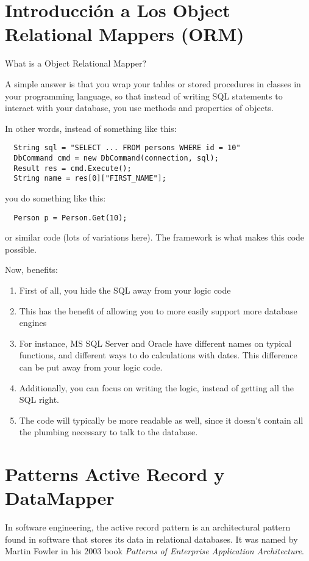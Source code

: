 
\section{Introducción a Los Object Relational Mappers (ORM)}

What is a Object Relational Mapper?

A simple answer is that you wrap your tables or stored procedures
in classes in your programming language, so that instead of writing
SQL statements to interact with your database, you use methods and
properties of objects.

In other words, instead of something like this:

\begin{verbatim}
  String sql = "SELECT ... FROM persons WHERE id = 10"
  DbCommand cmd = new DbCommand(connection, sql);
  Result res = cmd.Execute();
  String name = res[0]["FIRST_NAME"];
\end{verbatim}
you do something like this:

\begin{verbatim}
  Person p = Person.Get(10);
\end{verbatim}

or similar code (lots of variations here). 
The framework is what makes this code possible.

Now, benefits:

\begin{enumerate}
\item 
First of all, you hide the SQL away from your logic
code
\item 
This has the benefit of allowing you to more easily support
more database engines 
\item 
For instance, MS SQL Server and Oracle have
different names on typical functions, and different ways to do
calculations with dates.
This difference can be put away from your
logic code.
\item 
Additionally, you can focus on writing the logic, instead of getting all the SQL right.
\item 
The code will typically be more readable as well, since it doesn't
contain all the plumbing necessary to talk to the database.
\end{enumerate}

\section{Patterns Active Record y  DataMapper}

In software engineering, the active record pattern is an architectural
pattern found in software that stores its data in relational databases. It
was named by Martin Fowler in his 2003 book {\it Patterns of Enterprise
Application Architecture}. 

